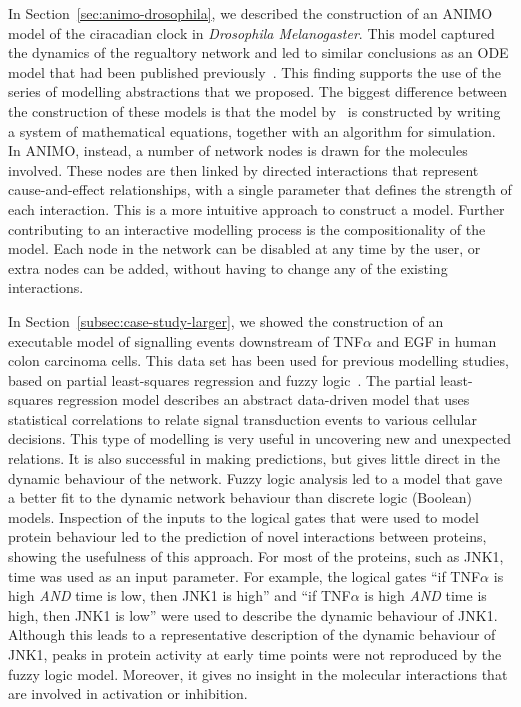 In Section~\ref{sec:animo-drosophila}, we described the construction of an ANIMO
model of the ciracadian clock in \emph{Drosophila Melanogaster}. This model
captured the dynamics of the regualtory network and led to similar 
conclusions as an ODE model that had been
published previously~\citep{drosophila-ode-model}. This finding supports the use of
the series of modelling abstractions that we proposed. The biggest
difference between the construction of these models is that the model by~\citet{drosophila-ode-model}
is constructed by writing a system of mathematical equations, together
with an algorithm for simulation. In ANIMO, instead, a number of network
nodes is drawn for the molecules involved. 
These nodes are then linked by directed
interactions that represent cause-and-effect relationships, with a single parameter 
that defines the strength of each
interaction. This is a more intuitive approach to construct a model.
Further contributing to an interactive modelling process
is the compositionality of the model. Each node in the network
can be disabled at any time by the user, or extra nodes can be added,
without having to change any of the existing interactions.

In Section~\ref{subsec:case-study-larger}, we showed the construction of an executable model
of signalling events downstream of
TNF$\alpha$ and EGF in human colon carcinoma cells. This data set has been used for
previous modelling studies, based on partial least-squares regression and fuzzy 
logic~\citep{pathway-leastsquare,pathway-fuzzy}.
The partial least-squares regression model describes an abstract data-driven model 
that uses statistical correlations
to relate signal transduction events to various cellular decisions. This type of modelling is
very useful in uncovering new and unexpected relations. It is also successful in making
predictions, but gives little direct in the dynamic behaviour of the network. Fuzzy
logic analysis led to a model that gave a better fit to the dynamic network behaviour than
discrete logic (Boolean) models. Inspection of the inputs to the logical gates that were used
to model protein behaviour led to the prediction of novel interactions between proteins,
showing the usefulness of this approach. For most of the proteins, such as JNK1, time was
used as an input parameter. For example, the logical gates ``if TNF$\alpha$ is high
\emph{AND} time is low, then JNK1 is high'' and ``if TNF$\alpha$ is high \emph{AND} time is
high, then JNK1 is low'' were used to
describe the dynamic behaviour of JNK1. Although this leads to a representative
description of the dynamic behaviour of JNK1, peaks in protein activity at early time points were
not reproduced by the fuzzy logic model. Moreover, it gives no insight in the molecular interactions 
that are involved in activation or inhibition.

